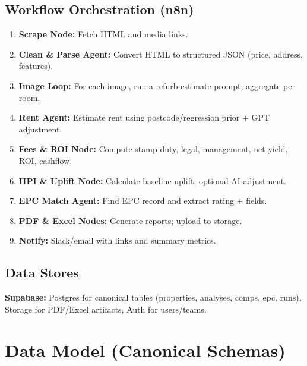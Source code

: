 \documentclass[12pt,a4paper]{article}
\begin{document}
\subsection{Workflow Orchestration (n8n)}
\begin{enumerate}[leftmargin=1.5em]
  \item \textbf{Scrape Node:} Fetch HTML and media links.
  \item \textbf{Clean \& Parse Agent:} Convert HTML to structured JSON (price, address, features).
  \item \textbf{Image Loop:} For each image, run a refurb-estimate prompt, aggregate per room.
  \item \textbf{Rent Agent:} Estimate rent using postcode/regression prior + GPT adjustment.
  \item \textbf{Fees \& ROI Node:} Compute stamp duty, legal, management, net yield, ROI, cashflow.
  \item \textbf{HPI \& Uplift Node:} Calculate baseline uplift; optional AI adjustment.
  \item \textbf{EPC Match Agent:} Find EPC record and extract rating + fields.
  \item \textbf{PDF \& Excel Nodes:} Generate reports; upload to storage.
  \item \textbf{Notify:} Slack/email with links and summary metrics.
\end{enumerate}

\subsection{Data Stores}
\textbf{Supabase:} Postgres for canonical tables (properties, analyses, comps, epc, runs), Storage for PDF/Excel artifacts, Auth for users/teams.

\section{Data Model (Canonical Schemas)}
\end{document}
